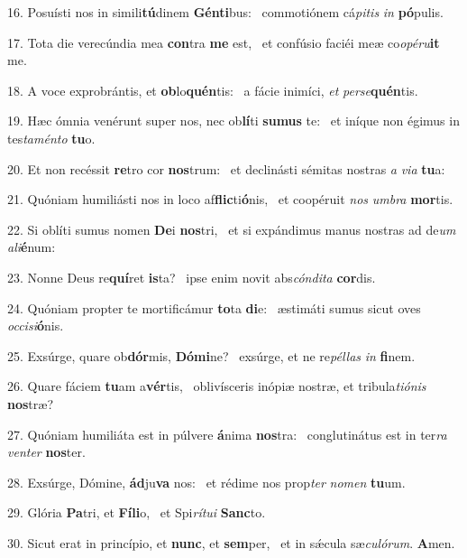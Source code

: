 16. Posuísti nos in simili\textbf{tú}dinem \textbf{Gén}\textbf{ti}bus: \ast\  commotiónem cá\textit{pi}\textit{tis} \textit{in} \textbf{pó}pulis.\

17. Tota die verecúndia mea \textbf{con}tra \textbf{me} est, \ast\  et confúsio faciéi meæ co\textit{o}\textit{pé}\textit{ru}\textbf{it} me.\

18. A voce exprobrántis, et \textbf{ob}lo\textbf{quén}tis: \ast\  a fácie inimíci, \textit{et} \textit{per}\textit{se}\textbf{quén}tis.\

19. Hæc ómnia venérunt super nos, nec ob\textbf{lí}ti \textbf{su}\textbf{mus} te: \ast\  et iníque non égimus in tes\textit{ta}\textit{mén}\textit{to} \textbf{tu}o.\

20. Et non recéssit \textbf{re}tro cor \textbf{nos}trum: \ast\  et declinásti sémitas nostras \textit{a} \textit{vi}\textit{a} \textbf{tu}a:\

21. Quóniam humiliásti nos in loco af\textbf{flic}ti\textbf{ó}nis, \ast\  et coopéruit \textit{nos} \textit{um}\textit{bra} \textbf{mor}tis.\

22. Si oblíti sumus nomen \textbf{De}i \textbf{nos}tri, \ast\  et si expándimus manus nostras ad de\textit{um} \textit{a}\textit{li}\textbf{é}num:\

23. Nonne Deus re\textbf{quí}ret \textbf{is}ta? \ast\  ipse enim novit abs\textit{cón}\textit{di}\textit{ta} \textbf{cor}dis.\

24. Quóniam propter te mortificámur \textbf{to}ta \textbf{di}e: \ast\  æstimáti sumus sicut oves \textit{oc}\textit{ci}\textit{si}\textbf{ó}nis.\

25. Exsúrge, quare ob\textbf{dór}mis, \textbf{Dó}\textbf{mi}ne? \ast\  exsúrge, et ne re\textit{pél}\textit{las} \textit{in} \textbf{fi}nem.\

26. Quare fáciem \textbf{tu}am a\textbf{vér}tis, \ast\  oblivísceris inópiæ nostræ, et tribula\textit{ti}\textit{ó}\textit{nis} \textbf{nos}træ?\

27. Quóniam humiliáta est in púlvere \textbf{á}nima \textbf{nos}tra: \ast\  conglutinátus est in ter\textit{ra} \textit{ven}\textit{ter} \textbf{nos}ter.\

28. Exsúrge, Dómine, \textbf{ád}ju\textbf{va} nos: \ast\  et rédime nos prop\textit{ter} \textit{no}\textit{men} \textbf{tu}um.\

29. Glória \textbf{Pa}tri, et \textbf{Fí}\textbf{li}o, \ast\  et Spi\textit{rí}\textit{tu}\textit{i} \textbf{Sanc}to.\

30. Sicut erat in princípio, et \textbf{nunc}, et \textbf{sem}per, \ast\  et in sǽcula sæ\textit{cu}\textit{ló}\textit{rum}. \textbf{A}men.\

